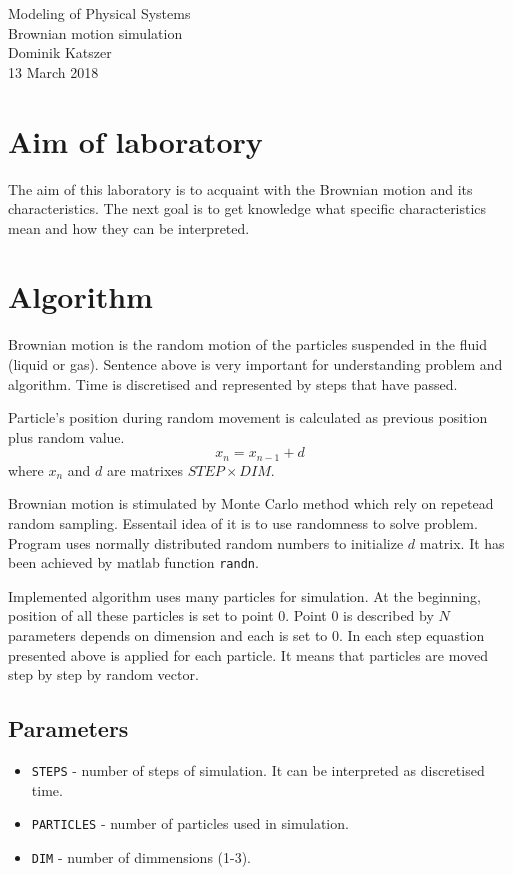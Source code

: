 \documentclass[a4paper,12pt]{article}
\begin{document}
\begin{titlepage}
\center
\vspace*{\fill}
\Huge{Modeling of Physical Systems}\\
\Large{Brownian motion simulation}\\
\vspace*{1.5cm}
Dominik Katszer\\
\large{13 March 2018}
\vspace*{1.5cm}
\vspace*{\fill}
\end{titlepage}
\section{Aim of laboratory}
The aim of this laboratory is to acquaint with the Brownian motion and its characteristics. The next goal is to get knowledge what specific characteristics mean and how they can be interpreted.
\section{Algorithm}
Brownian motion is the random motion of the particles suspended in the fluid (liquid or gas). Sentence above is very important for understanding problem and algorithm. Time is discretised and represented by steps that have passed.

Particle's position during random movement is calculated as previous position plus random value.
$$
x_n = x_{n-1} +d
$$ 
where $x_n$ and $d$ are matrixes $STEP\times DIM$. 

Brownian motion is stimulated by Monte Carlo method which rely on repetead random sampling. Essentail idea of it is to use randomness to solve problem. Program uses normally distributed random numbers to initialize $d$ matrix. It has been achieved by matlab function \verb!randn!.

Implemented algorithm uses many particles for simulation. At the beginning, position of all these particles is set to point 0. Point 0 is described by $N$ parameters depends on dimension and each is set to 0. In each step equastion presented above is applied for each particle. It means that particles are moved step by step by random vector.
\subsection{Parameters}
\begin{itemize}
\item \verb!STEPS! - number of steps of simulation. It can be interpreted as discretised time.
\item \verb!PARTICLES! - number of particles used in simulation.
\item \verb!DIM! - number of dimmensions (1-3).
\end{itemize}
\end{document}
